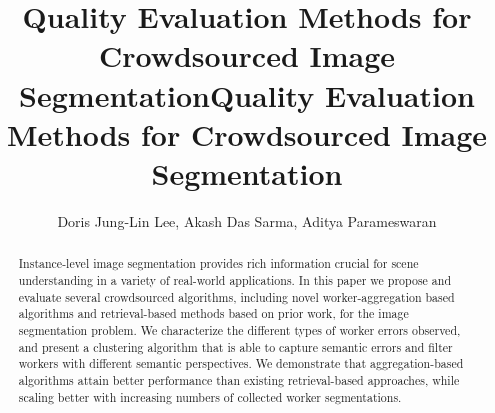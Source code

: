 \documentclass[letterpaper]{article} %
\title{Quality Evaluation Methods for Crowdsourced Image Segmentation}
\begin{document}
           \title{Quality Evaluation Methods for Crowdsourced Image Segmentation}
           \author{Doris Jung-Lin Lee, Akash Das Sarma, Aditya Parameswaran}
           \maketitle
           \begin{abstract}
           Instance-level image segmentation provides rich information crucial for scene understanding in a variety of real-world applications. In this paper we propose and evaluate several crowdsourced algorithms, including novel worker-aggregation based algorithms and retrieval-based methods based on prior work, for the image segmentation problem. We characterize the different types of worker errors observed, and present a clustering algorithm that is able to capture semantic errors and filter workers with different semantic perspectives. We demonstrate that aggregation-based algorithms attain better performance than existing retrieval-based approaches, while scaling better with increasing numbers of collected worker segmentations. 
           \vspace{-10pt}
          \end{abstract}
               
          
          
          
          
          
          


\end{document}
